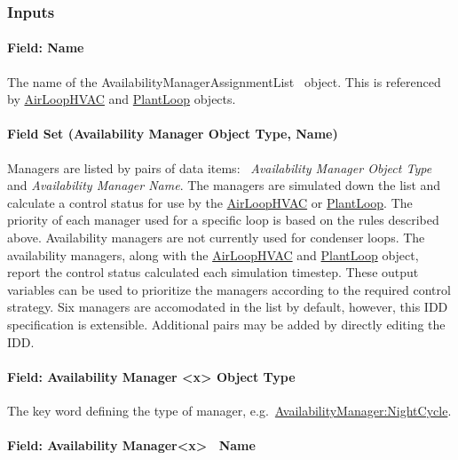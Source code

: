 \subsubsection{Inputs}\label{inputs-2-002}

\paragraph{Field: Name}\label{field-name-2-001}

The name of the AvailabilityManagerAssignmentList ~object. This is referenced by \hyperref[airloophvac]{AirLoopHVAC} and \hyperref[plantloop]{PlantLoop} objects.

\paragraph{Field Set (Availability Manager Object Type, Name)}\label{field-set-availability-manager-object-type-name}

Managers are listed by pairs of data items:~ \emph{Availability Manager Object Type} and \emph{Availability Manager Name}. The managers are simulated down the list and calculate a control status for use by the \hyperref[airloophvac]{AirLoopHVAC} or \hyperref[plantloop]{PlantLoop}. The priority of each manager used for a specific loop is based on the rules described above. Availability managers are not currently used for condenser loops. The availability managers, along with the \hyperref[airloophvac]{AirLoopHVAC} and \hyperref[plantloop]{PlantLoop} object, report the control status calculated each simulation timestep. These output variables can be used to prioritize the managers according to the required control strategy. Six managers are accomodated in the list by default, however, this IDD specification is extensible. Additional pairs may be added by directly editing the IDD.

\paragraph{Field: Availability Manager \textless{}x\textgreater{} Object Type}\label{field-availability-manager-x-object-type}

The key word defining the type of manager, e.g.~\hyperref[availabilitymanagernightcycle]{AvailabilityManager:NightCycle}.

\paragraph{Field: Availability Manager\textless{}x\textgreater{}~ Name}\label{field-availability-managerx-name}

